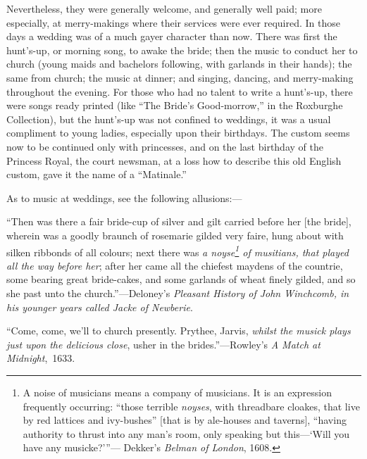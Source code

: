 Nevertheless, they were generally welcome, and
generally well paid; more especially, at merry-makings where their services were
ever required. In those days a wedding was of a much gayer character than
now. There was first the hunt’s-up, \pagebreak or morning song, to awake the bride; then
the music to conduct her to church (young maids and bachelors following, with
garlands in their hands); the same from church; the music at dinner; and
singing, dancing, and merry-making throughout the evening. For those who had
no talent to write a hunt’s-up, there were songs ready printed (like “The Bride’s
Good-morrow,” in the Roxburghe Collection), but the hunt’s-up was not confined
to weddings, it was a usual compliment to young ladies, especially upon their
birthdays. The custom seems now to be continued only with princesses, and on
the last birthday of the Princess Royal, the court newsman, at a loss how to
describe this old English custom, gave it the name of a “Matinale.”

As to music at weddings, see the following allusions:—

“Then was there a fair bride-cup of silver and gilt carried before her [the
bride], wherein was a goodly braunch of rosemarie gilded very faire, hung about
with silken ribbonds of all colours; next there was \textit{a noyse\footnote{\textit{}
A noise of musicians means a company of musicians.
It is an expression frequently occurring: “those terrible
\textit{noyses}, with threadbare cloakes, that live by red lattices
and ivy-bushes” [that is by ale-houses and taverns],
“having authority to thrust into any man’s room, only
speaking but this—‘Will you have any musicke?’”---
Dekker's \textit{Belman of London}, 1608.}
of musitians, that
played all the way before her}; after her came all the chiefest maydens of the
countrie, some bearing great bride-cakes, and some garlands of wheat finely
gilded, and so she past unto the church.”—Deloney’s \textit{Pleasant History of John
Winchcomb, in his younger years called Jacke of Newberie}.

“Come, come, we’ll to church presently. Prythee, Jarvis, \textit{whilst the musick
plays just upon the delicious close}, usher in the brides.”—Rowley’s \textit{A Match at
Midnight},~1633.

